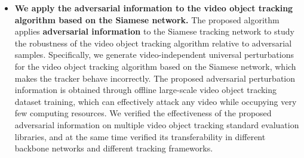 \begin{itemize}
\item{\textbf{We apply the adversarial information to the video object tracking algorithm based on the Siamese network.} The proposed algorithm applies \textbf{adversarial information} to the Siamese tracking network to study the robustness of the video object tracking algorithm relative to adversarial samples. Specifically, we generate video-independent universal perturbations for the video object tracking algorithm based on the Siamese network, which makes the tracker behave incorrectly. The proposed adversarial perturbation information is obtained through offline large-scale video object tracking dataset training, which can effectively attack any video while occupying very few computing resources. We verified the effectiveness of the proposed adversarial information on multiple video object tracking standard evaluation libraries, and at the same time verified its transferability in different backbone networks and different tracking frameworks.}
\end{itemize}

